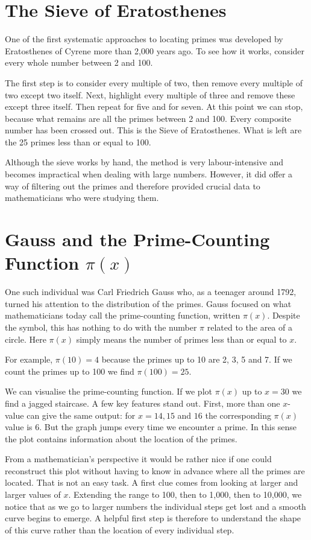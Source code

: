 \documentclass[11pt]{article}
\begin{document}
\section{The Sieve of Eratosthenes}

One of the first systematic approaches to locating primes was developed by Eratosthenes of Cyrene more than 2,000 years ago. To see how it works, consider every whole number between 2 and 100.

The first step is to consider every multiple of two, then remove every multiple of two except two itself. Next, highlight every multiple of three and remove these except three itself. Then repeat for five and for seven. At this point we can stop, because what remains are all the primes between 2 and 100. Every composite number has been crossed out. This is the Sieve of Eratosthenes. What is left are the 25 primes less than or equal to 100.

Although the sieve works by hand, the method is very labour-intensive and becomes impractical when dealing with large numbers. However, it did offer a way of filtering out the primes and therefore provided crucial data to mathematicians who were studying them.

\section{Gauss and the Prime-Counting Function $\pi(x)$}

One such individual was Carl Friedrich Gauss who, as a teenager around 1792, turned his attention to the distribution of the primes. Gauss focused on what mathematicians today call the prime-counting function, written $\pi(x)$. Despite the symbol, this has nothing to do with the number $\pi$ related to the area of a circle. Here $\pi(x)$ simply means the number of primes less than or equal to $x$.

For example, $\pi(10) = 4$ because the primes up to 10 are 2, 3, 5 and 7. If we count the primes up to 100 we find $\pi(100) = 25$.

We can visualise the prime-counting function. If we plot $\pi(x)$ up to $x = 30$ we find a jagged staircase. A few key features stand out. First, more than one $x$-value can give the same output: for $x = 14, 15$ and $16$ the corresponding $\pi(x)$ value is 6. But the graph jumps every time we encounter a prime. In this sense the plot contains information about the location of the primes.

From a mathematician's perspective it would be rather nice if one could reconstruct this plot without having to know in advance where all the primes are located. That is not an easy task. A first clue comes from looking at larger and larger values of $x$. Extending the range to 100, then to 1{,}000, then to 10{,}000, we notice that as we go to larger numbers the individual steps get lost and a smooth curve begins to emerge. A helpful first step is therefore to understand the shape of this curve rather than the location of every individual step.
\end{document}
